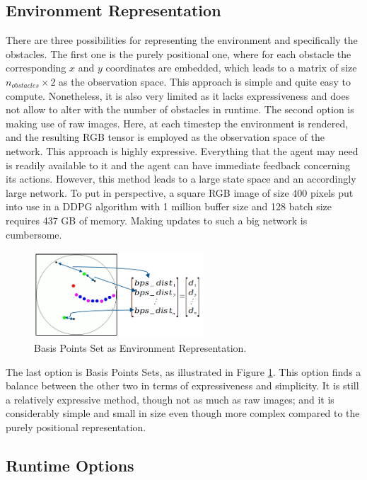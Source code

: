 \documentclass[conference]{IEEEtran}
\begin{document}
\subsection{Environment Representation}

There are three possibilities for representing the environment and specifically the obstacles. The first one is the purely positional one, where for each obstacle the corresponding $x$ and $y$ coordinates are embedded, which leads to a matrix of size $n_{obstacles} \times 2$ as the observation space. This approach is simple and quite easy to compute. Nonetheless, it is also very limited as it lacks expressiveness and does not allow to alter with the number of obstacles in runtime. 
The second option is making use of raw images. Here, at each timestep the environment is rendered, and the resulting RGB tensor is employed as the observation space of the network. This approach is highly expressive. Everything that the agent may need is readily available to it and the agent can have immediate feedback concerning its actions. However, this method leads to a large state space and an accordingly large network. To put in perspective, a square RGB image of size 400 pixels put into use in a DDPG algorithm with 1 million buffer size and 128 batch size requires 437 GB of memory. Making updates to such a big network is cumbersome. 

\begin{figure}[!t]
\centering
\includegraphics[width=2.5in]{bpsill}
\caption{Basis Points Set as Environment Representation.}
\label{bps_ill}
\end{figure}

The last option is Basis Points Sets, as illustrated in Figure \ref{bps_ill}. This option finds a balance between the other two in terms of expressiveness and simplicity. It is still a relatively expressive method, though not as much as raw images; and it is considerably simple and small in size even though more complex compared to the purely positional representation.

\subsection{Runtime Options}
\end{document}
